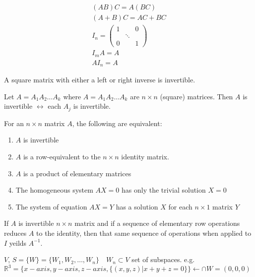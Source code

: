 \begin{theorem} 
	\begin{align} 
		(AB)C = A(BC) \\
		(A+B)C = AC+BC \\
		I_n=\begin{pmatrix} 
			1 & &0\\
			 &\ddots \\
			0 & & 1
		\end{pmatrix} \\
		I_mA = A \\
		AI_n = A
	\end{align}
\end{theorem}

\begin{corollary} 
	A square matrix with either a left or right inverse is invertible.
\end{corollary}

\begin{corollary} 
	Let $A = A_1A_2 \hdots A_k $ where $A = A_1A_2 \hdots A_k $ are $n\times n$ (square) matrices. Then $A$ is invertible $\leftrightarrow$ each $A_j$ is invertible.
\end{corollary}


\begin{theorem} 
	For an $n\times n$ matrix $A$, the following are equivalent:
	\begin{enumerate} 
		\item $A$ is invertible
		\item $A$ is a row-equivalent to the $n \times n$ identity matrix.
		\item $A$ is a product of elementary matrices
		\item The homogeneous system $AX=0$ has only the trivial solution $X=0$
		\item The system of equation $AX=Y$ has a solution $X$ for each $n\times 1$ matrix $Y$
	\end{enumerate}
\end{theorem}

\begin{corollary} 
	If $A$ is invertible $n\times n$ matrix and if a sequence of elementary row operations reduces $A$ to the identity, then that same sequence of operations when applied to $I$ yeilds $A^{-1}$.
\end{corollary}


$V$, $S=\{W\}=\{W_1,W_2,\hdots,W_n\}\quad W_n\subset V$ set of subspaces. e.g. $\mathbb{R}^3 = \{x-axis,y-axis,z-axis,\{(x,y,z)|x+y+z=0\}\}\leftarrow \cap W = {(0,0,0)}$

